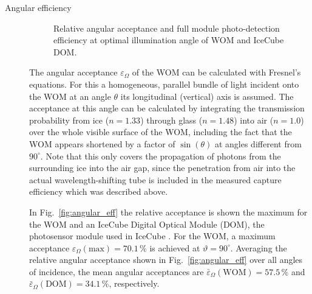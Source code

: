 \begin{description}
\item[Angular efficiency]

\begin{figure}[htb]
\centering
  \caption{Relative angular acceptance \protect{} and full
    module photo-detection efficiency at optimal illumination angle
    \protect{} of WOM and IceCube DOM.}
\label{fig:WOM_DOM_effs}
\end{figure}


The angular acceptance $\varepsilon_\Omega$ of the WOM can be calculated with 
Fresnel's equations. For this a homogeneous, parallel bundle of light incident
onto the WOM at an angle $\theta$ \wrt its longitudinal (\ie vertical) axis is
assumed. The acceptance at this angle can be calculated by integrating the
transmission probability from ice ($n=1.33$) through glass ($n=1.48$) into air
($n=1.0$) over the whole visible surface of the WOM, including the fact that the
WOM appears shortened by a factor of $\sin(\theta)$ at angles different from
$90^\circ$. Note that this only covers the propagation of photons from the
surrounding ice into the air gap, since the penetration from air into the
actual wavelength-shifting tube is included in the measured capture efficiency
which was described above.

In Fig.~\ref{fig:angular_eff} the relative acceptance is shown \wrt the maximum 
for the WOM and an IceCube Digital Optical Module (DOM), the photosensor module 
used in IceCube \cite{Dima}. For the WOM, a maximum acceptance
$\varepsilon_\Omega(\mathrm{max}) = 70.1\,\%$ is achieved at 
$\vartheta=90^\circ$. Averaging the relative angular acceptance shown in 
Fig.~\ref{fig:angular_eff} over all angles of incidence, the mean angular 
acceptances are $\bar\varepsilon_\Omega(\mathrm{WOM}) = 57.5\,\%$ and 
$\bar\varepsilon_\Omega(\mathrm{DOM}) = 34.1\,\%$, respectively.

\end{description}

